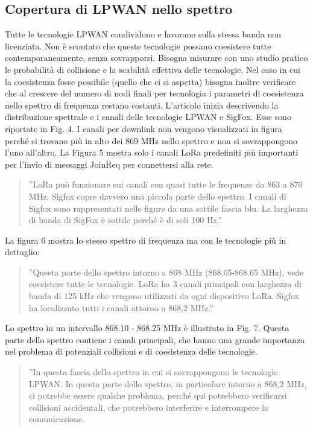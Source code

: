 \documentclass[a4paper]{report} %
\begin{document}
\subsection{Copertura di LPWAN nello spettro}
Tutte le tecnologie LPWAN condividono e lavorano sulla stessa banda non licenziata. Non è scontato che queste tecnologie possano coesistere tutte contemporaneamente, senza sovrapporsi. Bisogna misurare con uno studio pratico le probabilità di collisione e la scabilità effettiva delle tecnologie. Nel caso in cui la coesistenza fosse possibile (quello che ci si aspetta) bisogna inoltre verificare che al crescere del numero di nodi finali per tecnologia i parametri di coesistenza nello spettro di frequenza restano costanti.
L'articolo \cite{art:rif.46} inizia descrivendo la distribuzione spettrale e i canali delle tecnologie LPWAN e SigFox. Esse sono riportate in Fig. 4. I canali per downlink non vengono visualizzati in figura perché si trovano più in alto dei 869 MHz nello spettro e non si sovrappongono l'uno all'altro. La Figura 5 mostra solo i canali LoRa predefiniti più importanti per l'invio di messaggi JoinReq per connettersi alla rete.  
\begin{quote}
	''LoRa può funzionare sui canali con quasi tutte le frequenze da 863 a 870 MHz. Sigfox copre davvero una piccola parte dello spettro. I canali di Sigfox sono rappresentati nelle figure da una sottile fascia blu. La larghezza di banda di SigFox è sottile perché è di soli 100 Hz.''
\end{quote}
La figura 6 mostra lo stesso spettro di frequenza ma con le tecnologie più in dettaglio:
\begin{quote}
	''Questa parte dello spettro intorno a 868 MHz (868.05-868.65 MHz), vede coesistere tutte le tecnologie. LoRa ha 3 canali principali con larghezza di banda di 125 kHz che vengono utilizzati da ogni dispositivo LoRa. Sigfox ha localizzato tutti i canali attorno a 868,2 MHz.''
\end{quote}
Lo spettro in un intervallo 868.10 - 868.25 MHz è illustrato in Fig. 7. Questa parte dello spettro contiene i canali principali, che hanno una grande importanza nel problema di potenziali collisioni e di coesistenza delle tecnologie. 
\begin{quote}
	''In questa fascia dello spettro in cui si sovrappongono le tecnologie LPWAN. In questa parte dello spettro, in particolare intorno a 868,2 MHz, ci potrebbe essere qualche problema, perché qui potrebbero verificarsi collisioni accidentali, che potrebbero interferire e interrompere la comunicazione.
\end{quote}
\end{document}
